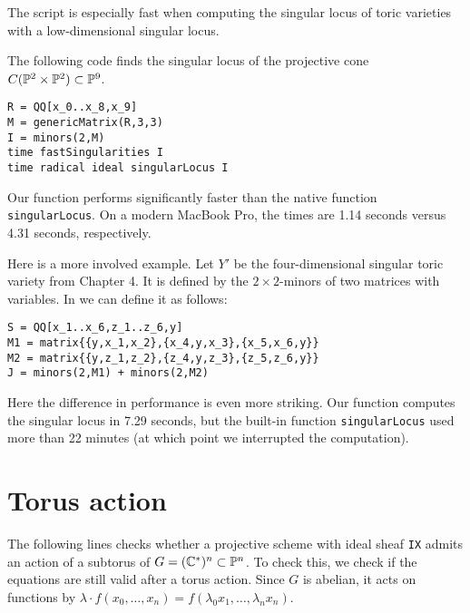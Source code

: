 The script is especially fast when computing the singular locus of toric varieties with a low-dimensional singular locus.

The following code finds the singular locus of the projective cone $C(\P^2 \times \P^2) \subset \P^9$.

\begin{lstlisting}[language=Macaulay2]
R = QQ[x_0..x_8,x_9]
M = genericMatrix(R,3,3)
I = minors(2,M)
time fastSingularities I
time radical ideal singularLocus I
\end{lstlisting}

Our function performs significantly faster than the native function \texttt{singularLocus}. On a modern MacBook Pro, the times are 1.14 seconds versus 4.31 seconds, respectively.

Here is a more involved example. Let $Y'$ be the four-dimensional singular toric variety from Chapter 4. It is defined by the $2 \times 2$-minors of two matrices with variables. In \MM we can define it as follows:
\begin{lstlisting}[language=Macaulay2]
S = QQ[x_1..x_6,z_1..z_6,y]
M1 = matrix{{y,x_1,x_2},{x_4,y,x_3},{x_5,x_6,y}}
M2 = matrix{{y,z_1,z_2},{z_4,y,z_3},{z_5,z_6,y}}
J = minors(2,M1) + minors(2,M2)
\end{lstlisting}

Here the difference in performance is even more striking. Our function computes the singular locus in 7.29 seconds, but the built-in function \texttt{singularLocus} used more than 22 minutes (at which point we interrupted the computation).

\section{Torus action}

The following lines checks whether a projective scheme with ideal sheaf \texttt{IX} admits an action of a subtorus of $G=(\C^\ast)^n \subset \P^n$. To check this, we check if the equations are still valid after a torus action. Since $G$ is abelian, it acts on functions by $\lambda \cdot f(x_0,\ldots,x_n)=f(\lambda_0 x_1, \ldots, \lambda_n x_n)$. 


